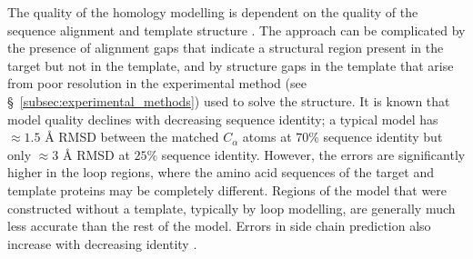 The quality of the homology modelling is dependent on the quality of the sequence alignment and template structure \cite{Fasnacht2007aa, Lee2007aa}. The approach can be complicated by the presence of alignment gaps that indicate a structural region present in the target but not in the template, and by structure gaps in the template that arise from poor resolution in the experimental method (see \S~\ref{subsec:experimental_methods}) used to solve the structure. It is known that model quality declines with decreasing sequence identity; a typical model has $\approx 1.5$ \AA{} RMSD between the matched $C_{\alpha}$ atoms at $70\%$ sequence identity but only $\approx 3$ \AA{} RMSD at $25\%$ sequence identity. However, the errors are significantly higher in the loop regions, where the amino acid sequences of the target and template proteins may be completely different. Regions of the model that were constructed without a template, typically by loop modelling, are generally much less accurate than the rest of the model. Errors in side chain prediction also increase with decreasing identity \cite{Eramian2006aa}.\\

